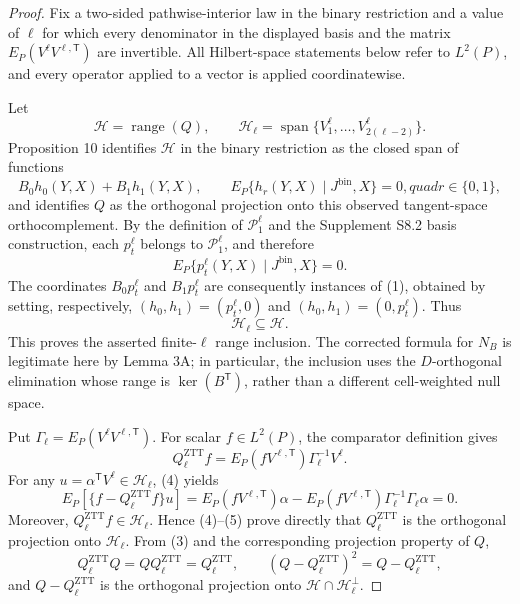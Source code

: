 \documentclass{article}
\begin{document}
\begin{proof}
Fix a two-sided pathwise-interior law in the binary restriction and a value of \(\ell\) for which every denominator in the displayed basis and the matrix \(E_P(V^\ell V^{\ell,\mathsf T})\) are invertible.  All Hilbert-space statements below refer to \(L^2(P)\), and every operator applied to a vector is applied coordinatewise.

Let
\[
\mathcal H=\operatorname{range}(Q),
\qquad
\mathcal H_\ell=\operatorname{span}\{V_1^\ell,\ldots,V_{2(\ell-2)}^\ell\}.
\]
Proposition 10 identifies \(\mathcal H\) in the binary restriction as the closed span of functions
\[
B_0h_0(Y,X)+B_1h_1(Y,X),
\qquad
E_P\{h_r(Y,X)\mid J^{\mathrm{bin}},X\}=0,quad r\in\{0,1\},                                      \tag{1}
\]
and identifies \(Q\) as the orthogonal projection onto this observed tangent-space orthocomplement.  By the definition of \(\mathcal P_1^\ell\) and the Supplement S8.2 basis construction, each \(p_t^\ell\) belongs to \(\mathcal P_1^\ell\), and therefore
\[
E_P\{p_t^\ell(Y,X)\mid J^{\mathrm{bin}},X\}=0.                                            \tag{2}
\]
The coordinates \(B_0p_t^\ell\) and \(B_1p_t^\ell\) are consequently instances of (1), obtained by setting, respectively, \((h_0,h_1)=(p_t^\ell,0)\) and \((h_0,h_1)=(0,p_t^\ell)\).  Thus
\[
\mathcal H_\ell\subseteq\mathcal H.                                                       \tag{3}
\]
This proves the asserted finite-\(\ell\) range inclusion.  The corrected formula for \(N_B\) is legitimate here by Lemma 3A; in particular, the inclusion uses the \(D\)-orthogonal elimination whose range is \(\ker(B^{\mathsf T})\), rather than a different cell-weighted null space.

Put \(\Gamma_\ell=E_P(V^\ell V^{\ell,\mathsf T})\).  For scalar \(f\in L^2(P)\), the comparator definition gives
\[
Q_\ell^{\mathrm{ZTT}}f
=E_P(fV^{\ell,\mathsf T})\Gamma_\ell^{-1}V^\ell.                                           \tag{4}
\]
For any \(u=\alpha^{\mathsf T}V^\ell\in\mathcal H_\ell\), (4) yields
\[
E_P\!\left[\{f-Q_\ell^{\mathrm{ZTT}}f\}u\right]
=E_P(fV^{\ell,\mathsf T})\alpha
-E_P(fV^{\ell,\mathsf T})\Gamma_\ell^{-1}\Gamma_\ell\alpha
=0.                                                                                        \tag{5}
\]
Moreover, \(Q_\ell^{\mathrm{ZTT}}f\in\mathcal H_\ell\).  Hence (4)--(5) prove directly that \(Q_\ell^{\mathrm{ZTT}}\) is the orthogonal projection onto \(\mathcal H_\ell\).  From (3) and the corresponding projection property of \(Q\),
\[
Q_\ell^{\mathrm{ZTT}}Q=QQ_\ell^{\mathrm{ZTT}}=Q_\ell^{\mathrm{ZTT}},
\qquad
(Q-Q_\ell^{\mathrm{ZTT}})^2=Q-Q_\ell^{\mathrm{ZTT}},                                      \tag{6}
\]
and \(Q-Q_\ell^{\mathrm{ZTT}}\) is the orthogonal projection onto \(\mathcal H\cap\mathcal H_\ell^\perp\).


\end{proof}
\end{document}
